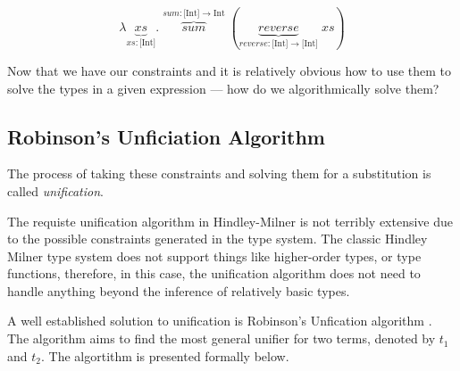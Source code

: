 \documentclass{l4proj}
\begin{document}
\[\lambda \underbrace{xs}_{xs : \text{[Int]}} . \; \overbrace{\mathit{sum}}^{sum : \text{[Int]} \rightarrow \text{Int}} \; (\underbrace{\mathit{reverse}}_{reverse : \text{[Int]} \rightarrow \text{[Int]}} \; xs)\]

Now that we have our constraints and it is relatively obvious how to use them to solve the types in a given expression — how do we algorithmically solve them?

\subsection*{Robinson's Unficiation Algorithm}

The process of taking these constraints and solving them for a substitution is called \emph{unification}\citep{Robinson_1965}.

The requiste unification algorithm in Hindley-Milner is not terribly extensive due to the possible constraints generated in the type system.
The classic Hindley Milner type system does not support things like higher-order types, or type functions, therefore, in this case, the unification algorithm does not need to handle anything beyond the inference of relatively basic types.

A well established solution to unification is Robinson's Unfication algorithm \citep{Robinson_1965}.
The algorithm aims to find the most general unifier for two terms, denoted by $t_1$ and $t_2$.
The algortithm is presented formally below.



\end{document}
